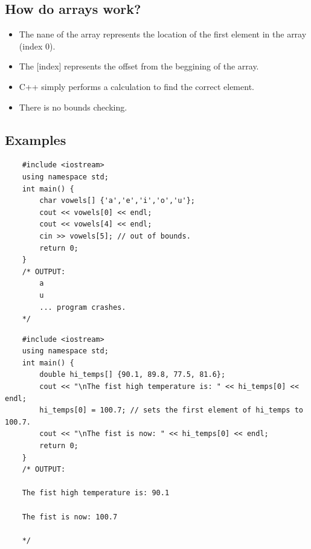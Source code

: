 \subsection{How do arrays work?}
\begin{itemize}
    \item The nane of the array represents the location of the first element in the array (index 0).
    \item The [index] represents the offset from the beggining of the array.
    \item C++ simply performs a calculation to find the correct element.
    \item There is no bounds checking.
\end{itemize}

\subsection{Examples}
\begin{verbatim}
    #include <iostream>
    using namespace std;
    int main() {
        char vowels[] {'a','e','i','o','u'};
        cout << vowels[0] << endl; 
        cout << vowels[4] << endl; 
        cin >> vowels[5]; // out of bounds.
        return 0;
    }
    /* OUTPUT:
        a
        u
        ... program crashes.
    */
\end{verbatim}
\begin{verbatim}
    #include <iostream>
    using namespace std;
    int main() {
        double hi_temps[] {90.1, 89.8, 77.5, 81.6};
        cout << "\nThe fist high temperature is: " << hi_temps[0] << endl;
        hi_temps[0] = 100.7; // sets the first element of hi_temps to 100.7.
        cout << "\nThe fist is now: " << hi_temps[0] << endl;
        return 0;
    } 
    /* OUTPUT: 

    The fist high temperature is: 90.1

    The fist is now: 100.7

    */
\end{verbatim}

